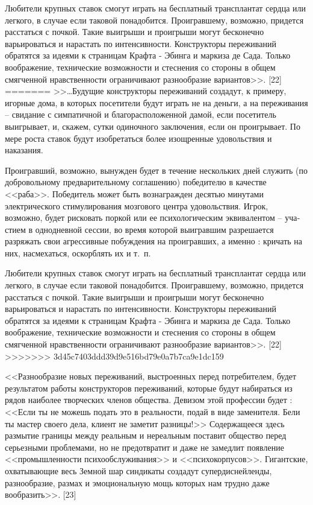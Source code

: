 \documentclass{book}
\begin{document}
{Любители крупных ставок смогут играть на бесплатный трансплантат сердца или легкого, в случае если таковой пона­добится. Проигравшему, возможно, придется расстаться с поч­кой. Такие выигрыши и проигрыши могут бесконечно варьироваться и нарастать по интенсивности. Конструкторы пережи­ваний обратятся за идеями к страницам Крафта ‑ Эбинга и мар­киза де Сада. Только воображение, технические возможности и стеснения со стороны в общем смягченной нравственности ограничивают разнообразие вариантов>>. [22]
=======
>>\ldots Будущие конструкторы переживаний создадут, к приме­ру, игорные дома, в которых посетители будут играть не на деньги, а на переживания -- свидание с симпатичной и благо­расположенной дамой, если посетитель выигрывает, и, скажем, сутки одиночного заключения, если он проигрывает. По мере роста ставок будут изобретаться более изощренные удовольст­вия и наказания.

Проигравший, возможно, вынужден будет в течение несколь­ких дней служить (по добровольному предварительному согла­шению) победителю в качестве <<раба>>. Победитель может быть вознагражден десятью минутами электрического стимулирова­ния мозгового центра удовольствия. Игрок, возможно, будет рисковать поркой или ее психологическим эквивалентом -- уча­стием в однодневной сессии, во время которой выигравшим разрешается разряжать свои агрессивные побуждения на проиг­равших, а именно : кричать на них, насмехаться, оскорблять их и т.~п.

Любители крупных ставок смогут играть на бесплатный трансплантат сердца или легкого, в случае если таковой пона­добится. Проигравшему, возможно, придется расстаться с поч­кой. Такие выигрыши и проигрыши могут бесконечно варьироваться и нарастать по интенсивности. Конструкторы пережи­ваний обратятся за идеями к страницам Крафта - Эбинга и мар­киза де Сада. Только воображение, технические возможности и стеснения со стороны в общем смягченной нравственности ограничивают разнообразие вариантов>>. [22]
>>>>>>> 3d45c7403ddd39d9e516bd79e0a7b7ca9e1dc159

<<Разнообразие новых переживаний, выстроенных перед по­требителем, будет результатом работы конструкторов пережи­ваний, которые будут набираться из рядов наиболее творче­ских членов общества. Девизом этой профессии будет : <<Если ты не можешь подать это в реальности, подай в виде заменителя. Бели ты мастер своего дела, клиент не заметит разницы!>> Содер­жащееся здесь размытие границы между реальным и нереаль­ным поставит общество перед серьезными проблемами, но не предотвратит и даже не замедлит появление <<промышленности психообслуживания>> и <<психокорпусов>>. Гигантские, охваты­вающие весь Земной шар синдикаты создадут супердиснейленды, разнообразие, размах и эмоциональную мощь которых нам трудно даже вообразить>>. [23]


}
\end{document}
